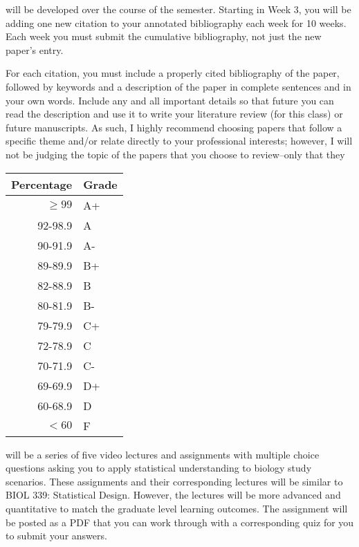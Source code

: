 \documentclass{tufte-handout}
\begin{document}
 will be developed over the course of the semester. Starting in Week 3, you will be adding one new citation to your annotated bibliography each week for 10 weeks. Each week you must submit the cumulative bibliography, not just the new paper's entry. 

For each citation, you must include a properly cited bibliography of the paper, followed by keywords and a description of the paper in complete sentences and in your own words. Include any and all important details so that future you can read the description and use it to write your literature review (for this class) or future manuscripts. As such, I highly recommend choosing papers that follow a specific theme and/or relate directly to your professional interests; however, I will not be judging the topic of the papers that you choose to review--only that they 



\begin{margintable}
\begin{tabular}{rl}
Percentage & Grade \\
\hline 
$\ge99$ & A+ \\
92-98.9 & A \\
90-91.9 & A- \\
89-89.9 & B+ \\
82-88.9 & B \\
80-81.9 & B- \\
79-79.9 & C+ \\
72-78.9 & C \\
70-71.9 & C- \\
69-69.9 & D+ \\
60-68.9 & D \\
$<60$ & F \\
\hline
\end{tabular}
\end{margintable}






 will be a series of five video lectures and assignments with multiple choice questions asking you to apply statistical understanding to biology study scenarios. These assignments and their corresponding lectures will be similar to BIOL 339: Statistical Design. However, the lectures will be more advanced and quantitative to match the graduate level learning outcomes. The assignment will be posted as a PDF that you can work through with a corresponding quiz for you to submit your answers. 
\end{document}
